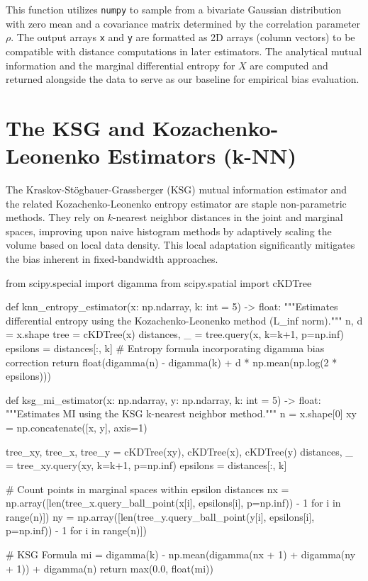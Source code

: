 This function utilizes \texttt{numpy} to sample from a bivariate Gaussian distribution with zero mean and a covariance matrix determined by the correlation parameter $\rho$. The output arrays \texttt{x} and \texttt{y} are formatted as 2D arrays (column vectors) to be compatible with distance computations in later estimators. The analytical mutual information and the marginal differential entropy for $X$ are computed and returned alongside the data to serve as our baseline for empirical bias evaluation.

\section{The KSG and Kozachenko-Leonenko Estimators (k-NN)}

The Kraskov-Stögbauer-Grassberger (KSG) mutual information estimator and the related Kozachenko-Leonenko entropy estimator are staple non-parametric methods. They rely on $k$-nearest neighbor distances in the joint and marginal spaces, improving upon naive histogram methods by adaptively scaling the volume based on local data density. This local adaptation significantly mitigates the bias inherent in fixed-bandwidth approaches. 

\begin{pycode}
from scipy.special import digamma
from scipy.spatial import cKDTree

def knn_entropy_estimator(x: np.ndarray, k: int = 5) -> float:
    """Estimates differential entropy using the Kozachenko-Leonenko method (L_inf norm)."""
    n, d = x.shape
    tree = cKDTree(x)
    distances, _ = tree.query(x, k=k+1, p=np.inf)
    epsilons = distances[:, k]
    # Entropy formula incorporating digamma bias correction
    return float(digamma(n) - digamma(k) + d * np.mean(np.log(2 * epsilons)))

def ksg_mi_estimator(x: np.ndarray, y: np.ndarray, k: int = 5) -> float:
    """Estimates MI using the KSG k-nearest neighbor method."""
    n = x.shape[0]
    xy = np.concatenate([x, y], axis=1)
    
    tree_xy, tree_x, tree_y = cKDTree(xy), cKDTree(x), cKDTree(y)
    distances, _ = tree_xy.query(xy, k=k+1, p=np.inf)
    epsilons = distances[:, k]
    
    # Count points in marginal spaces within epsilon distances
    nx = np.array([len(tree_x.query_ball_point(x[i], epsilons[i], p=np.inf)) - 1 for i in range(n)])
    ny = np.array([len(tree_y.query_ball_point(y[i], epsilons[i], p=np.inf)) - 1 for i in range(n)])
    
    # KSG Formula
    mi = digamma(k) - np.mean(digamma(nx + 1) + digamma(ny + 1)) + digamma(n)
    return max(0.0, float(mi))
\end{pycode}

